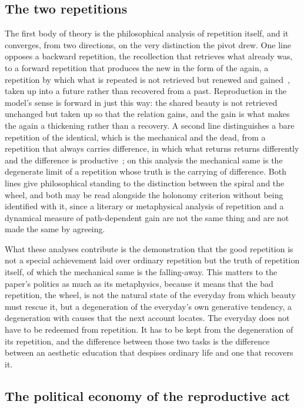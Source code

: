\subsection{The two repetitions}
\label{p22:sub:reproduction-two-repetitions}

The first body of theory is the philosophical analysis of repetition itself, and it converges, from two directions, on the very distinction the pivot drew. One line opposes a backward repetition, the recollection that retrieves what already was, to a forward repetition that produces the new in the form of the again, a repetition by which what is repeated is not retrieved but renewed and gained~\parencite{kierkegaard_repetition}, taken up into a future rather than recovered from a past. Reproduction in the model's sense is forward in just this way: the shared beauty is not retrieved unchanged but taken up so that the relation gains, and the gain is what makes the again a thickening rather than a recovery. A second line distinguishes a bare repetition of the identical, which is the mechanical and the dead, from a repetition that always carries difference, in which what returns returns differently and the difference is productive~\parencite{deleuze_difference}; on this analysis the mechanical same is the degenerate limit of a repetition whose truth is the carrying of difference. Both lines give philosophical standing to the distinction between the spiral and the wheel, and both may be read alongside the holonomy criterion without being identified with it, since a literary or metaphysical analysis of repetition and a dynamical measure of path-dependent gain are not the same thing and are not made the same by agreeing.

What these analyses contribute is the demonstration that the good repetition is not a special achievement laid over ordinary repetition but the truth of repetition itself, of which the mechanical same is the falling-away. This matters to the paper's politics as much as its metaphysics, because it means that the bad repetition, the wheel, is not the natural state of the everyday from which beauty must rescue it, but a degeneration of the everyday's own generative tendency, a degeneration with causes that the next account locates. The everyday does not have to be redeemed from repetition. It has to be kept from the degeneration of its repetition, and the difference between those two tasks is the difference between an aesthetic education that despises ordinary life and one that recovers it.

\subsection{The political economy of the reproductive act}
\label{p22:sub:reproduction-political-economy}

